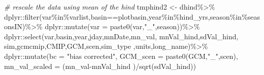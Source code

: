 \documentclass[
]{article}
\newenvironment{Shaded}{\begin{snugshade}}{\end{snugshade}}
\newcommand{\AttributeTok}[1]{\textcolor[rgb]{0.77,0.63,0.00}{#1}}
\newcommand{\CommentTok}[1]{\textcolor[rgb]{0.56,0.35,0.01}{\textit{#1}}}
\newcommand{\FunctionTok}[1]{\textcolor[rgb]{0.00,0.00,0.00}{#1}}
\newcommand{\NormalTok}[1]{#1}
\newcommand{\OtherTok}[1]{\textcolor[rgb]{0.56,0.35,0.01}{#1}}
\newcommand{\SpecialCharTok}[1]{\textcolor[rgb]{0.00,0.00,0.00}{#1}}
\newcommand{\StringTok}[1]{\textcolor[rgb]{0.31,0.60,0.02}{#1}}
\begin{document}
\begin{Shaded}
\begin{Highlighting}[]
      
       \CommentTok{\# rescale the data using mean of the hind}
\NormalTok{       tmphind2    }\OtherTok{\textless{}{-}}\NormalTok{ dhind}\SpecialCharTok{\%\textgreater{}\%}
\NormalTok{         dplyr}\SpecialCharTok{::}\FunctionTok{filter}\NormalTok{(var}\SpecialCharTok{\%in\%}\NormalTok{varlist,basin}\SpecialCharTok{==}\NormalTok{plotbasin,year}\SpecialCharTok{\%in\%}\NormalTok{hind\_yrs,season}\SpecialCharTok{\%in\%}\NormalTok{seasonsIN)}\SpecialCharTok{\%\textgreater{}\%}
\NormalTok{          dplyr}\SpecialCharTok{::}\FunctionTok{mutate}\NormalTok{(}\AttributeTok{var =} \FunctionTok{paste0}\NormalTok{(var,}\StringTok{"\_"}\NormalTok{,season))}\SpecialCharTok{\%\textgreater{}\%}
\NormalTok{         dplyr}\SpecialCharTok{::}\FunctionTok{select}\NormalTok{(var,basin,year,jday,mnDate,mn\_val, }
\NormalTok{                       mnVal\_hind,sdVal\_hind, sim,gcmcmip,CMIP,GCM,scen,sim\_type ,units,long\_name)}\SpecialCharTok{\%\textgreater{}\%}
\NormalTok{         dplyr}\SpecialCharTok{::}\FunctionTok{mutate}\NormalTok{(}\AttributeTok{bc =} \StringTok{"bias corrected"}\NormalTok{,}
                       \AttributeTok{GCM\_scen =} \FunctionTok{paste0}\NormalTok{(GCM,}\StringTok{"\_"}\NormalTok{,scen),}
                       \AttributeTok{mn\_val\_scaled =}\NormalTok{ (mn\_val}\SpecialCharTok{{-}}\NormalTok{mnVal\_hind )}\SpecialCharTok{/}\FunctionTok{sqrt}\NormalTok{(sdVal\_hind))}
       

\end{Highlighting}
\end{Shaded}
\end{document}
